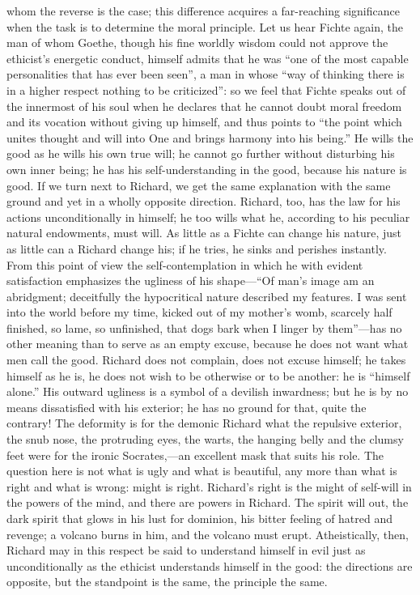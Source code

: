\documentclass[12pt,a4paper,openany]{book}
\newcommand{\opage}[1]{\marginnote{\footnotesize\textit{[#1]}}}
\begin{document}
whom the reverse is the case; this difference acquires
a far-reaching significance when the task is to determine
the moral principle. Let us hear Fichte again, the man
of whom Goethe, though his fine worldly wisdom could not
approve the ethicist's energetic conduct, himself admits
that he was ``one of the most capable personalities
that has ever been seen'', a man in whose ``way of thinking
there is in a higher respect nothing to be criticized'': so
we feel that Fichte speaks out of the innermost of his soul when
he declares that he cannot doubt moral
freedom and its vocation without giving up himself,
and thus points to ``the point which unites thought
and will into One and brings harmony into his being.''
He wills the good as he wills his own true will; he
cannot go further without disturbing his own
inner being; he has his self-understanding in the good, because
his nature is good. If we turn next to Richard,
we get the same explanation with the same ground
and yet in a wholly opposite direction. Richard, too, has
the law for his actions unconditionally in himself; he too
wills what he, according to his peculiar natural endowments,
must will. As little as a Fichte can change
his nature, just as little can a Richard change his;
if he tries, he sinks and perishes instantly. From this point of view the self-contemplation
in which he with evident satisfaction emphasizes
the ugliness of his shape---``Of man's image
\setcounter{footnote}{0}%
\opage{538}am an abridgment; deceitfully the hypocritical nature
described my features. I was sent into the world before my time,
kicked out of my mother's womb, scarcely half finished, so lame,
so unfinished, that dogs bark when I linger by them''---has no
other meaning than to serve as an empty excuse, because he does not
want what men call the good. Richard does not complain, does not
excuse himself; he takes himself as he is, he does not wish to
be otherwise or to be another: he is ``himself
alone.'' His outward ugliness is a symbol of a
devilish inwardness; but he is by no means dissatisfied with his
exterior; he has no ground for that, quite the contrary! The deformity
is for the demonic Richard what the repulsive
exterior, the snub nose, the protruding eyes, the warts,
the hanging belly and the clumsy feet were for the
ironic Socrates,---an excellent mask that suits
his role. The question here is not what is
ugly and what is beautiful, any more than what is
right and what is wrong: might is right. Richard's right
is the might of self-will in the powers of the mind, and there are powers
in Richard. The spirit will out, the dark spirit that
glows in his lust for dominion, his bitter feeling of hatred
and revenge; a volcano burns in him, and the volcano
must erupt. Atheistically, then, Richard
may in this respect be said to understand himself in evil
just as unconditionally as the ethicist understands himself in the
good: the directions are opposite, but the standpoint is
the same, the principle the same.
\end{document}
